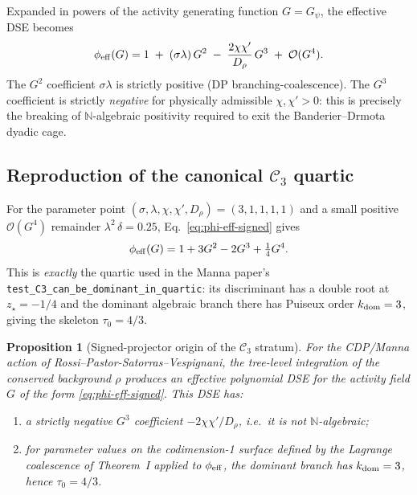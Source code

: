 \documentclass[11pt,a4paper]{article}
\newcommand{\Cstr}[1]{\mathcal{C}_{#1}}
\newcommand{\N}{\mathbb{N}}
\theoremstyle{plain}
\newtheorem{proposition}[theorem]{Proposition}
\theoremstyle{definition}
\begin{document}
Expanded in powers of the activity generating function $G = G_\psi$,
the effective DSE becomes
\begin{equation}
\label{eq:phi-eff-signed}
  \phi_{\rm eff}(G) = 1 \;+\; (\sigma\lambda)\,G^2
   \;-\; \frac{2\chi\chi'}{D_\rho}\,G^3 \;+\; \mathcal{O}(G^4).
\end{equation}
The $G^2$ coefficient $\sigma\lambda$ is strictly positive (DP
branching-coalescence).  The $G^3$ coefficient is strictly
\emph{negative} for physically admissible $\chi,\chi' > 0$: this is
precisely the breaking of $\N$-algebraic positivity required to
exit the Banderier--Drmota dyadic cage.

\subsection{Reproduction of the canonical $\mathcal{C}_3$ quartic}

For the parameter point $(\sigma, \lambda, \chi, \chi', D_\rho) = (3,
1, 1, 1, 1)$ and a small positive $\mathcal{O}(G^4)$ remainder
$\lambda^2\,\delta = 0.25$, Eq.~\eqref{eq:phi-eff-signed} gives
\[
  \phi_{\rm eff}(G) = 1 + 3G^2 - 2G^3 + \tfrac{1}{4} G^4.
\]
This is \emph{exactly} the quartic used in the Manna paper's
\texttt{test\_C3\_can\_be\_dominant\_in\_quartic}: its discriminant
has a double root at $z_\star = -1/4$ and the dominant algebraic
branch there has Puiseux order $k_{\rm dom} = 3$, giving the
skeleton $\tau_0 = 4/3$.

\begin{thmbox}
\begin{proposition}[Signed-projector origin of the
$\Cstr{3}$ stratum]
\label{prop:signed-proj}
For the CDP/Manna action of Rossi--Pastor-Satorras--Vespignani, the
tree-level integration of the conserved background $\rho$ produces
an effective polynomial DSE for the activity field $G$ of the form
\eqref{eq:phi-eff-signed}.  This DSE has:
\begin{enumerate}[label=(\roman*), leftmargin=1.6em, itemsep=1pt]
  \item a \emph{strictly negative} $G^3$ coefficient
    $-2\chi\chi'/D_\rho$, i.e.\ it is not $\N$-algebraic;
  \item for parameter values on the codimension-1 surface defined by
    the Lagrange coalescence of Theorem~I applied to
    $\phi_{\rm eff}$, the dominant branch has $k_{\rm dom} = 3$, hence
    $\tau_0 = 4/3$.
\end{enumerate}
\end{proposition}
\end{thmbox}
\end{document}
